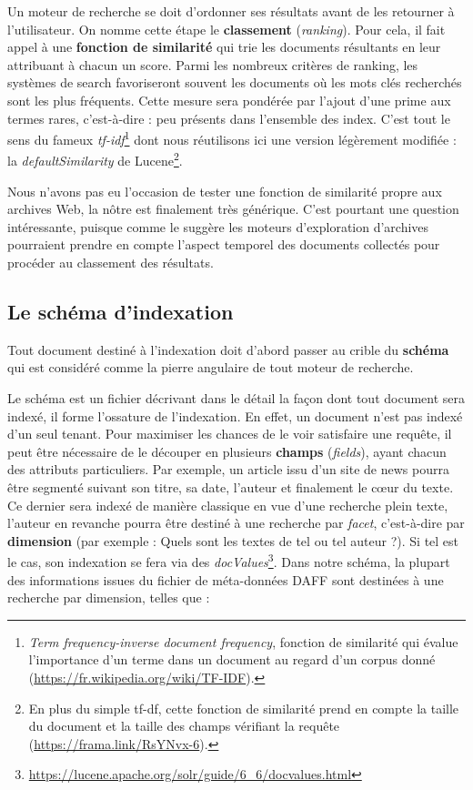 \documentclass[symmetric,justified,marginals=raggedouter]{tufte-book}
\begin{document}
Un moteur de recherche se doit d'ordonner ses résultats avant de les retourner à l'utilisateur. On nomme cette étape le \textbf{classement} (\textit{ranking}). Pour cela, il fait appel à une \textbf{fonction de similarité} qui trie les documents résultants en leur attribuant à chacun un score. Parmi les nombreux critères de ranking, les systèmes de search favoriseront souvent les documents où les mots clés recherchés sont les plus fréquents. Cette mesure sera pondérée par l'ajout d'une prime aux termes rares, c'est-à-dire : peu présents dans l'ensemble des index. C'est tout le sens du fameux \textit{tf-idf}\footnote{\RaggedOuter \textit{Term frequency-inverse document frequency}, fonction de similarité qui évalue l'importance d'un terme dans un document au regard d'un corpus donné (\url{https://fr.wikipedia.org/wiki/TF-IDF}).} dont nous réutilisons ici une version légèrement modifiée : la \textit{defaultSimilarity} de Lucene\footnote{\RaggedOuter En plus du simple tf-df, cette fonction de similarité prend en compte la taille du document et la taille des champs vérifiant la requête (\url{https://frama.link/RsYNvx-6}).}. 

Nous n'avons pas eu l'occasion de tester une fonction de similarité propre aux archives Web, la nôtre est finalement très générique. C'est pourtant une question  intéressante, puisque comme le suggère \citep{weikum_longitudinal_2011} les moteurs d'exploration d'archives pourraient prendre en compte l'aspect temporel des documents collectés pour procéder au classement des résultats. 

\subsection{Le schéma d'indexation}

\noindent Tout document destiné à l'indexation doit d'abord passer au crible du \textbf{schéma} qui est considéré comme la pierre angulaire de tout moteur de recherche. 

Le schéma est un fichier décrivant dans le détail la façon dont tout document sera indexé, il forme l'ossature de l'indexation. En effet, un document n'est pas indexé d'un seul tenant. Pour maximiser les chances de le voir satisfaire une requête, il peut être nécessaire de le découper en plusieurs \textbf{champs} (\textit{fields}), ayant chacun des attributs particuliers. Par exemple, un article issu d'un site de news pourra être segmenté suivant son titre, sa date, l'auteur et finalement le cœur du texte. Ce dernier sera indexé de manière classique en vue d'une recherche plein texte, l'auteur en revanche pourra être destiné à une recherche par \textit{facet}, c'est-à-dire par \textbf{dimension } (par exemple : Quels sont les textes de tel ou tel auteur ?). Si tel est le cas, son indexation se fera via des \textit{docValues}\footnote{\RaggedOuter \url{https://lucene.apache.org/solr/guide/6_6/docvalues.html}}. Dans notre schéma, la plupart des informations issues du fichier de méta-données DAFF sont destinées à une recherche par dimension, telles que :\\
\end{document}
